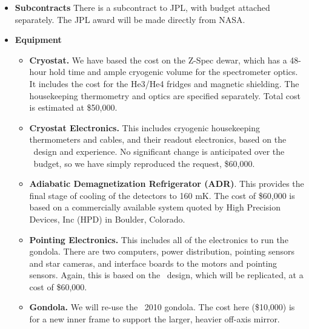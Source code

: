\begin{itemize}
\item
{\bf Subcontracts} There is a subcontract to JPL, with budget attached separately. The JPL award will be made directly from NASA.  

\item {\bf Equipment}

\begin{itemize}

\item
{\bf Cryostat.}  We have based the cost on the Z-Spec dewar, which has a 48-hour hold time and ample cryogenic volume for the spectrometer optics.  
It includes the cost for the He3/He4 fridges and magnetic shielding.  The housekeeping thermometry and optics are specified separately.
Total cost is
estimated at \$50,000.

\item
{\bf Cryostat Electronics.}  This includes cryogenic housekeeping thermometers and cables,  and their readout electronics, based on the \blast\ design and
experience.  No significant change is anticipated over the \blast\
budget, so we have simply reproduced the request, \$60,000.

\item
{\bf Adiabatic Demagnetization Refrigerator (ADR)}.  This provides the final stage of cooling of the detectors to 160 mK.  The cost of \$60,000 is based on a commercially available system quoted by High Precision Devices, Inc (HPD) in Boulder, Colorado. 


\item
{\bf Pointing Electronics.} This includes all of the electronics to
run the gondola.  There are two computers, power distribution,
pointing sensors and star cameras, and interface boards to the motors and pointing
sensors.  Again, this is based on the \blast\ design, which will be
replicated, at a cost of \$60,000.

\item
{\bf Gondola.}  We will re-use the \blast\ 2010 gondola.  The cost here (\$10,000) is for a new inner frame to support the larger, heavier off-axis mirror.


\end{itemize}
\end{itemize}
